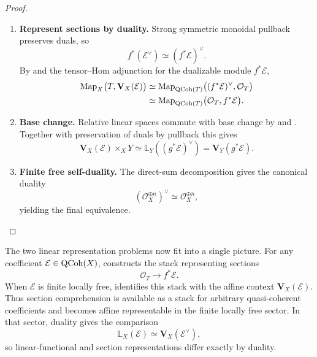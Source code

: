 \begin{proof}
\leavevmode
\begin{enumerate}[label=\textup{(\arabic*)}]
    \item \textbf{Represent sections by duality.}
    Strong symmetric monoidal pullback preserves duals, so
    \[
        f^*(\mathcal E^\vee)
        \simeq
        (f^*\mathcal E)^\vee.
    \]
    By  and the tensor--Hom adjunction
    for the dualizable module \(f^*\mathcal E\),
    \[
    \begin{aligned}
        \operatorname{Map}_X\bigl(T,\mathbf V_X(\mathcal E)\bigr)
        &\simeq
        \operatorname{Map}_{\operatorname{QCoh}(T)}
        \bigl((f^*\mathcal E)^\vee,\mathcal O_T\bigr)
        \\
        &\simeq
        \operatorname{Map}_{\operatorname{QCoh}(T)}
        \bigl(\mathcal O_T,f^*\mathcal E\bigr).
    \end{aligned}
    \]

    \item \textbf{Base change.}
    Relative linear spaces commute with base change by
     and
    . Together with preservation
    of duals by pullback this gives
    \[
        \mathbf V_X(\mathcal E)\times_XY
        \simeq
        \mathbb L_Y((g^*\mathcal E)^\vee)
        =
        \mathbf V_Y(g^*\mathcal E).
    \]

    \item \textbf{Finite free self-duality.}
    The direct-sum decomposition gives the canonical duality
    \[
        (\mathcal O_X^{\oplus n})^\vee
        \simeq
        \mathcal O_X^{\oplus n},
    \]
    yielding the final equivalence.
\end{enumerate}
\end{proof}

\begin{remark}
\label{rem:linear-comprehension}
The two linear representation problems now fit into a single picture. For
any coefficient \(\mathcal E\in\operatorname{QCoh}(X)\),
 constructs the stack representing sections
\[
    \mathcal O_T\longrightarrow f^*\mathcal E.
\]
When \(\mathcal E\) is finite locally free,
 identifies this stack with the
affine context \(\mathbf V_X(\mathcal E)\). Thus section comprehension is
available as a stack for arbitrary quasi-coherent coefficients and becomes
affine representable in the finite locally free sector. In that sector,
duality gives the comparison
\[
    \mathbb L_X(\mathcal E)
    \simeq
    \mathbf V_X(\mathcal E^\vee),
\]
so linear-functional and section representations differ exactly by duality.
\end{remark}

